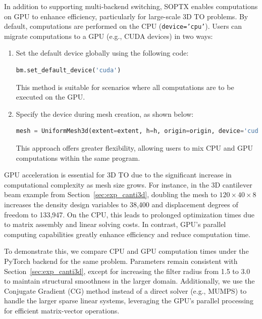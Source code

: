 \documentclass[mathpazo]{cicp}
\begin{document}
In addition to supporting multi-backend switching, SOPTX enables computations on GPU to enhance efficiency, particularly for large-scale 3D TO problems. By default, computations are performed on the CPU (\texttt{device='cpu'}). Users can migrate computations to a GPU (e.g., CUDA devices) in two ways:
\begin{enumerate}
	\item Set the default device globally using the following code:
\begin{lstlisting}[language=python]
bm.set_default_device('cuda')
\end{lstlisting}
	This method is suitable for scenarios where all computations are to be executed on the GPU.
	\item Specify the device during mesh creation, as shown below:
\begin{lstlisting}[language=python]
mesh = UniformMesh3d(extent=extent, h=h, origin=origin, device='cuda')
\end{lstlisting}
	This approach offers greater flexibility, allowing users to mix CPU and GPU computations within the same program.	
\end{enumerate}

GPU acceleration is essential for 3D TO due to the significant increase in computational complexity as mesh size grows. For instance, in the 3D cantilever beam example from Section~\ref{sec:exp_canti3d}, doubling the mesh to $120\times40\times8$ increases the density design variables to 38,400 and displacement degrees of freedom to 133,947. On the CPU, this leads to prolonged optimization times due to matrix assembly and linear solving costs. In contrast, GPU's parallel computing capabilities greatly enhance efficiency and reduce computation time.

To demonstrate this, we compare CPU and GPU computation times under the PyTorch backend for the same problem. Parameters remain consistent with Section~\ref{sec:exp_canti3d}, except for increasing the filter radius from 1.5 to 3.0 to maintain structural smoothness in the larger domain. Additionally, we use the Conjugate Gradient (CG) method instead of a direct solver (e.g., MUMPS) to handle the larger sparse linear systems, leveraging the GPU's parallel processing for efficient matrix-vector operations.
\end{document}
